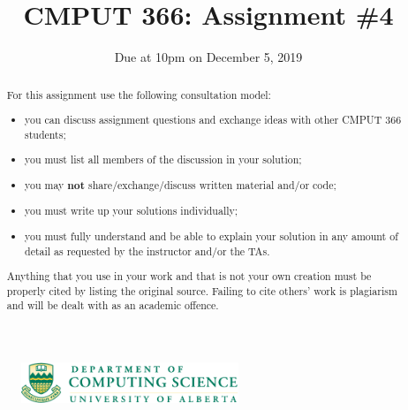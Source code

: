 \documentclass[12pt]{article}
\newcommand{\nin}{\noindent}
\newcommand{\ie}{\item}
\newcommand{\bei}{\begin{itemize}}
\newcommand{\eei}{\end{itemize}}
\newcommand{\tcm}[1]{\textcolor{m7}{#1}}
\begin{document}
\begin{figure}[t!]
\begin{center}
\includegraphics[width=6.5cm]{csLogo.pdf} %
\vspace{-1cm}
\end{center}
\end{figure}



\sloppy


\title{\bf CMPUT 366: Assignment \#4}

\author{\tcm{Due at 10pm on December 5, 2019}}

\date{}


\maketitle

\begin{abstract}
{\scriptsize \nin For this assignment use the following consultation model: \bei

\ie you can discuss assignment questions and exchange ideas with other CMPUT 366 students;

\ie you must list all members of the discussion in your solution;

\ie you may {\bf not} share/exchange/discuss written material and/or code;

\ie you must write up your solutions individually;

\ie you must fully understand and be able to explain your solution in any amount of detail as requested by the instructor and/or the TAs.

\eei

\nin Anything that you use in your work and that is not your own creation must be properly cited by listing the original source. Failing to cite others' work is plagiarism and will be dealt with as an academic offence.}
\end{abstract}


\vspace{0.3cm}
\hspace{1cm}{\bf First name:} \underline{\hspace{7cm}}
\end{document}
